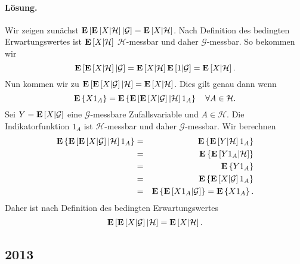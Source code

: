 \paragraph*{Lösung.} Wir zeigen zunächst 
$\mathbf{E}\left[ \mathbf{E}\left[ X | \mathcal H \right] | \mathcal G \right]=\mathbf{E} \left[ X | \mathcal H \right]$.
Nach Definition des bedingten Erwartungswertes ist $\mathbf{E}\left[ X| \mathcal H \right]$ 
$\mathcal H$-messbar und daher $\mathcal G$-messbar. So bekommen wir 
\begin{equation}
	\mathbf{E}\left[ \mathbf{E}\left[ X | \mathcal H \right] | \mathcal G \right] =
	\mathbf{E}\left[ X| \mathcal H \right] \mathbf{E}\left[ 1|\mathcal G \right] = 
	\mathbf{E} \left[ X | \mathcal H \right ].
\end{equation}
Nun kommen wir zu 
$\mathbf{E}\left[ \mathbf{E}\left[ X | \mathcal G \right] | \mathcal H \right]=\mathbf{E} \left[ X | \mathcal H \right]$.
Dies gilt genau dann wenn 
\begin{equation}
	\mathbf{E}\left\{ X 1_A \right\} 
	= \mathbf{E}\left\{ \mathbf{E}\left[ \mathbf{E}\left[ X|\mathcal G \right]|\mathcal H \right] 1_A \right\}  
	\quad \forall A\in\mathcal H.
\end{equation}
Sei $Y=\mathbf{E}\left[ X|\mathcal G \right]$ eine $\mathcal G$-messbare Zufallsvariable und
$A\in\mathcal H$. Die Indikatorfunktion $1_A$ ist $\mathcal H$-messbar und daher
$\mathcal G$-messbar. Wir berechnen
\begin{eqnarray}
	\mathbf{E}\left\{ \mathbf{E}\left[ \mathbf{E}\left[ X|\mathcal G \right]|\mathcal H \right] 1_A \right\} &=& 
	\mathbf{E}\left\{ \mathbf{E}\left[ Y|\mathcal H \right] 1_A \right\} \\
	&=& \mathbf{E}\left\{ \mathbf{E}\left[ Y 1_A| \mathcal H \right] \right\} \\
	&=& \mathbf{E}\left\{ Y 1_A \right\} \\
	&=& \mathbf{E}\left\{ \mathbf{E}\left[ X|\mathcal G \right] 1_A \right\} \\
	&=& \mathbf{E}\left\{ \mathbf{E}\left[ X 1_A| \mathcal G \right] \right\} = \mathbf{E}\left\{ X 1_A \right\}. 
\end{eqnarray}
Daher ist nach Definition des bedingten Erwartungswertes
\begin{equation}
	\mathbf{E}\left[ \mathbf{E}\left[ X | \mathcal G \right] | \mathcal H \right]=\mathbf{E} \left[ X | \mathcal H \right].
\end{equation}




\subsection{2013}

